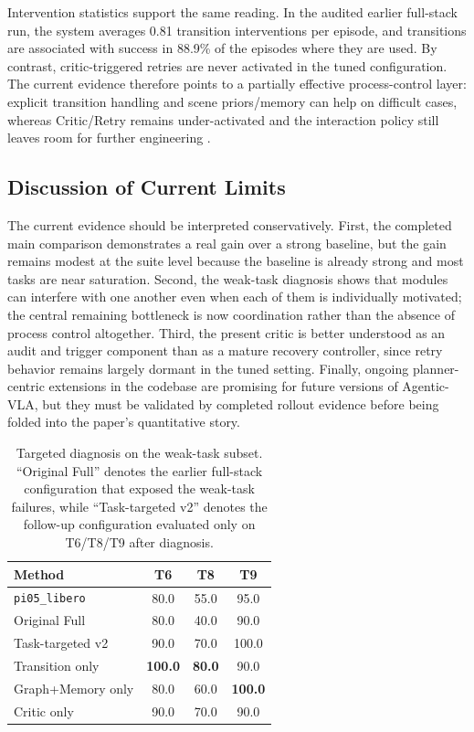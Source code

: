 \documentclass[a4paper]{Template/LaTeX_Templates/waica}
\begin{document}
Intervention statistics support the same reading. In the audited earlier full-stack run, the system averages 0.81 transition interventions per episode, and transitions are associated with success in 88.9\% of the episodes where they are used. By contrast, critic-triggered retries are never activated in the tuned configuration. The current evidence therefore points to a partially effective process-control layer: explicit transition handling and scene priors/memory can help on difficult cases, whereas Critic/Retry remains under-activated and the interaction policy still leaves room for further engineering \cite{failsafe,guardian}.

\subsection{Discussion of Current Limits}

The current evidence should be interpreted conservatively. First, the completed main comparison demonstrates a real gain over a strong baseline, but the gain remains modest at the suite level because the baseline is already strong and most tasks are near saturation. Second, the weak-task diagnosis shows that modules can interfere with one another even when each of them is individually motivated; the central remaining bottleneck is now coordination rather than the absence of process control altogether. Third, the present critic is better understood as an audit and trigger component than as a mature recovery controller, since retry behavior remains largely dormant in the tuned setting. Finally, ongoing planner-centric extensions in the codebase are promising for future versions of Agentic-VLA, but they must be validated by completed rollout evidence before being folded into the paper's quantitative story.

\begin{table}[t]
\caption{Targeted diagnosis on the weak-task subset. ``Original Full'' denotes the earlier full-stack configuration that exposed the weak-task failures, while ``Task-targeted v2'' denotes the follow-up configuration evaluated only on T6/T8/T9 after diagnosis.}
\label{tab:targeted_followup_results}
\centering
\small
\begin{tabular}{lccc}
\toprule
Method & T6 & T8 & T9 \\
\midrule
\texttt{pi05\_libero} & 80.0 & 55.0 & 95.0 \\
Original Full & 80.0 & 40.0 & 90.0 \\
Task-targeted v2 & 90.0 & 70.0 & 100.0 \\
Transition only & \textbf{100.0} & \textbf{80.0} & 90.0 \\
Graph+Memory only & 80.0 & 60.0 & \textbf{100.0} \\
Critic only & 90.0 & 70.0 & 90.0 \\
\bottomrule
\end{tabular}
\end{table}
\end{document}
